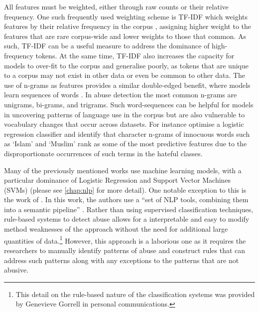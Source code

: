 All features must be weighted, either through raw counts or their relative frequency.
One such frequently used weighting scheme is TF-IDF which weights features by their relative frequency in the corpus \citep{Fortuna:2018}, assigning higher weight to the features that are rare corpus-wide and lower weights to those that common.
As such, TF-IDF can be a useful measure to address the dominance of high-frequency tokens.
At the same time, TF-IDF also increases the capacity for models to over-fit to the corpus and generalise poorly, as tokens that are unique to a corpus may not exist in other data or even be common to other data.
The use of n-grams as features provides a similar double-edged benefit, where models learn sequences of words .
In abuse detection the most common n-grams are unigrams, bi-grams, and trigrams.
Such word-sequences can be helpful for models in uncovering patterns of language use in the corpus but are also vulnerable to vocabulary changes that occur across datasets.
For instance \citet{Waseem-Hovy:2016} optimise a logistic regression classifier and identify that character n-grams of innocuous words such as `Islam' and `Muslim' rank as some of the most predictive features due to the disproportionate occurrences of such terms in the hateful classes.

Many of the previously mentioned works use  machine learning models, with a particular dominance of Logistic Regression and Support Vector Machines (SVMs) (please see \cref{chap:nlp} for more detail).
One notable exception to this is the work of \citet{Gorrell:2018}.
In this work, the authors use a ``set of NLP tools, combining them into a semantic pipeline'' \citep[pp. 601]{Gorrell:2018}.
Rather than using supervised classification techniques,  rule-based systems to detect abuse allows for a interpretable and easy to modify method weaknesses of the approach without the need for additional large quantities of data.\footnote{This detail on the rule-based nature of the classification systems was provided by Genevieve Gorrell in personal communications.}
However, this approach is a laborious one as it requires the researchers to manually identify patterns of abuse and construct rules that can address such patterns along with any exceptions to the patterns that are not abusive.

